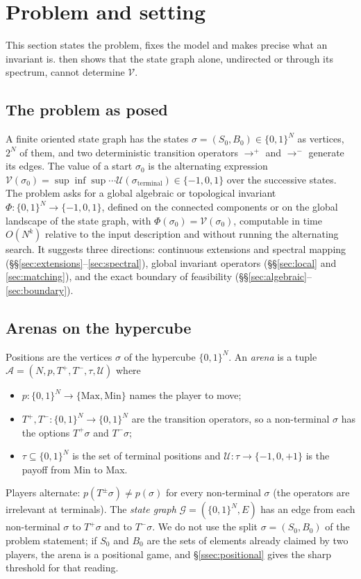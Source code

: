 \documentclass[final]{siamart0516}
\numberwithin{theorem}{section}
\numberwithin{equation}{section}
\theoremstyle{siamnonum}
\theoremstyle{plain}
\newcommand{\val}{\mathcal{V}}            %
\newcommand{\pay}{\mathcal{U}}            %
\newcommand{\SG}{\mathcal{G}}             %
\newcommand{\arena}{\mathcal{A}}          %
\begin{document}
\section{Problem and setting}\label{sec:setting}

This section states the problem, fixes the model and makes precise what an invariant is.  then shows that the state graph alone, undirected or through its spectrum, cannot determine $\val$.

\subsection*{The problem as posed}
A finite oriented state graph has the states $\sigma=(S_0,B_0)\in\{0,1\}^N$ as vertices, $2^N$ of them, and two deterministic transition operators $\to^{+}$ and $\to^{-}$ generate its edges. The value of a start $\sigma_0$ is the alternating expression $\val(\sigma_0)=\sup\inf\sup\cdots\pay(\sigma_{\mathrm{terminal}})\in\{-1,0,1\}$ over the successive states. The problem asks for a global algebraic or topological invariant $\Phi\colon\{0,1\}^N\to\{-1,0,1\}$, defined on the connected components or on the global landscape of the state graph, with $\Phi(\sigma_0)=\val(\sigma_0)$, computable in time $O(N^k)$ relative to the input description and without running the alternating search. It suggests three directions: continuous extensions and spectral mapping (\S\S\ref{sec:extensions}--\ref{sec:spectral}), global invariant operators (\S\S\ref{sec:local} and \ref{sec:matching}), and the exact boundary of feasibility (\S\S\ref{sec:algebraic}--\ref{sec:boundary}).

\subsection{Arenas on the hypercube}\label{ssec:arenas}
Positions are the vertices $\sigma$ of the hypercube $\{0,1\}^N$. An \emph{arena} is a tuple $\arena=(N,p,T^{+},T^{-},\tau,\pay)$ where
\begin{itemize}
\item $p\colon\{0,1\}^N\to\{\mathrm{Max},\mathrm{Min}\}$ names the player to move;
\item $T^{+},T^{-}\colon\{0,1\}^N\to\{0,1\}^N$ are the transition operators, so a non-terminal $\sigma$ has the options $T^{+}\sigma$ and $T^{-}\sigma$;
\item $\tau\subseteq\{0,1\}^N$ is the set of terminal positions and $\pay\colon\tau\to\{-1,0,+1\}$ is the payoff from Min to Max.
\end{itemize}
Players alternate: $p(T^{\pm}\sigma)\neq p(\sigma)$ for every non-terminal $\sigma$ (the operators are irrelevant at terminals). The \emph{state graph} $\SG=(\{0,1\}^N,E)$ has an edge from each non-terminal $\sigma$ to $T^{+}\sigma$ and to $T^{-}\sigma$. We do not use the split $\sigma=(S_0,B_0)$ of the problem statement; if $S_0$ and $B_0$ are the sets of elements already claimed by two players, the arena is a positional game, and \S\ref{ssec:positional} gives the sharp threshold for that reading.
\end{document}
